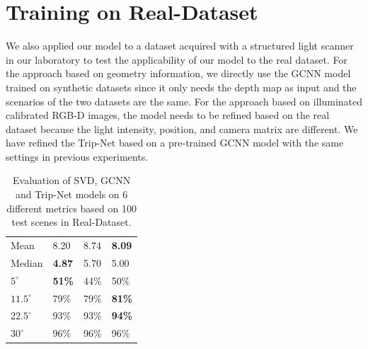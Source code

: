 \section{Training on Real-Dataset}
We also applied our model to a dataset acquired with a structured light scanner in our laboratory to test the applicability of our model to the real dataset. For the approach based on geometry information, we directly use the GCNN model trained on synthetic datasets since it only needs the depth map as input and the scenarios of the two datasets are the same. For the approach based on illuminated calibrated RGB-D images, the model needs to be refined based on the real dataset because the light intensity, position, and camera matrix are different. We have refined the Trip-Net based on a pre-trained GCNN model with the same settings in previous experiments.


\begin{table}[H]
	\centering
	\captionsetup{width=\linewidth}
	\begin{tabular}{l | l l l }
		\toprule
		\tabhead{Metrics} & \tabhead{SVD} & \tabhead{GCNN} & \tabhead{Trip-Net} \\
		\midrule
		Mean  					& 8.20 & 8.74 & \textbf{8.09}\\ 
		\hline
		Median					& \textbf{4.87} & 5.70 & 5.00 \\ 
		\hline
		$ 5^\circ $ 			& \textbf{51\%} & 44\% & 50\% \\
		\hline
		$ 11.5^\circ $ 			& 79\% & 79\% & \textbf{81\%} \\
		\hline
		$ 22.5^\circ $ 			& 93\% & 93\% & \textbf{94\%} \\
		\hline
		$ 30^\circ $ 			& 96\% & 96\% & 96\% \\
		\bottomrule
	\end{tabular}
	\caption{Evaluation of SVD, GCNN and Trip-Net models on 6 different metrics based on 100 test scenes in Real-Dataset.}	
	\label{tab:real_eval}
\end{table}




